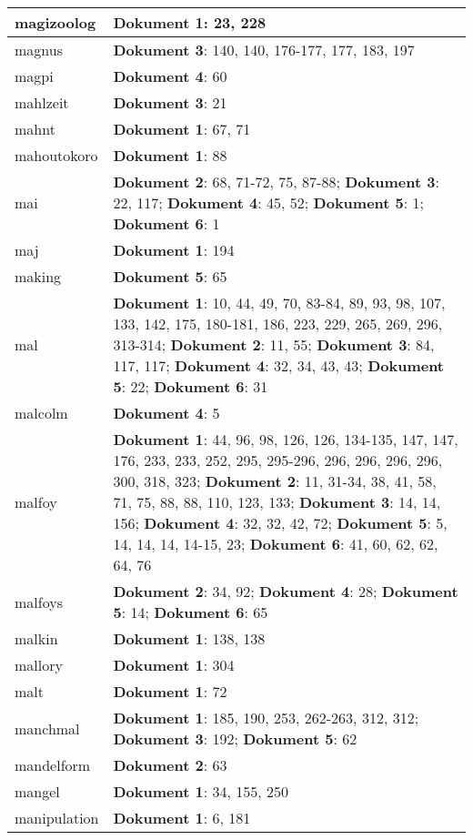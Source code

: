\documentclass[a5paper]{article}
\begin{document}
\begin{longtable}[l]{|l|p{3in}|}
\hline
magizoolog & \textbf{Dokument 1}: 23, 228 \\
\hline
magnus & \textbf{Dokument 3}: 140, 140, 176-177, 177, 183, 197 \\
\hline
magpi & \textbf{Dokument 4}: 60 \\
\hline
mahlzeit & \textbf{Dokument 3}: 21 \\
\hline
mahnt & \textbf{Dokument 1}: 67, 71 \\
\hline
mahoutokoro & \textbf{Dokument 1}: 88 \\
\hline
mai & \textbf{Dokument 2}: 68, 71-72, 75, 87-88; \textbf{Dokument 3}: 22, 117; \textbf{Dokument 4}: 45, 52; \textbf{Dokument 5}: 1; \textbf{Dokument 6}: 1 \\
\hline
maj & \textbf{Dokument 1}: 194 \\
\hline
making & \textbf{Dokument 5}: 65 \\
\hline
mal & \textbf{Dokument 1}: 10, 44, 49, 70, 83-84, 89, 93, 98, 107, 133, 142, 175, 180-181, 186, 223, 229, 265, 269, 296, 313-314; \textbf{Dokument 2}: 11, 55; \textbf{Dokument 3}: 84, 117, 117; \textbf{Dokument 4}: 32, 34, 43, 43; \textbf{Dokument 5}: 22; \textbf{Dokument 6}: 31 \\
\hline
malcolm & \textbf{Dokument 4}: 5 \\
\hline
malfoy & \textbf{Dokument 1}: 44, 96, 98, 126, 126, 134-135, 147, 147, 176, 233, 233, 252, 295, 295-296, 296, 296, 296, 296, 300, 318, 323; \textbf{Dokument 2}: 11, 31-34, 38, 41, 58, 71, 75, 88, 88, 110, 123, 133; \textbf{Dokument 3}: 14, 14, 156; \textbf{Dokument 4}: 32, 32, 42, 72; \textbf{Dokument 5}: 5, 14, 14, 14, 14-15, 23; \textbf{Dokument 6}: 41, 60, 62, 62, 64, 76 \\
\hline
malfoys & \textbf{Dokument 2}: 34, 92; \textbf{Dokument 4}: 28; \textbf{Dokument 5}: 14; \textbf{Dokument 6}: 65 \\
\hline
malkin & \textbf{Dokument 1}: 138, 138 \\
\hline
mallory & \textbf{Dokument 1}: 304 \\
\hline
malt & \textbf{Dokument 1}: 72 \\
\hline
manchmal & \textbf{Dokument 1}: 185, 190, 253, 262-263, 312, 312; \textbf{Dokument 3}: 192; \textbf{Dokument 5}: 62 \\
\hline
mandelform & \textbf{Dokument 2}: 63 \\
\hline
mangel & \textbf{Dokument 1}: 34, 155, 250 \\
\hline
manipulation & \textbf{Dokument 1}: 6, 181 \\

\end{longtable}
\end{document}
